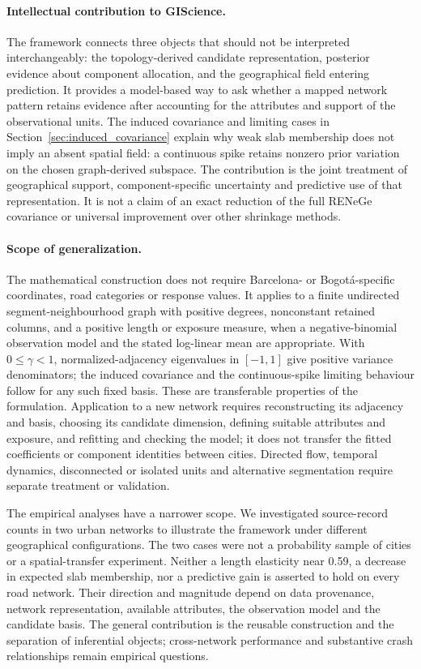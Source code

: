 \documentclass[11pt]{article}
\begin{document}
\paragraph{Intellectual contribution to GIScience.}
The framework connects three objects that should not be interpreted interchangeably: the topology-derived candidate representation, posterior evidence about component allocation, and the geographical field entering prediction. It provides a model-based way to ask whether a mapped network pattern retains evidence after accounting for the attributes and support of the observational units. The induced covariance and limiting cases in Section~\ref{sec:induced_covariance} explain why weak slab membership does not imply an absent spatial field: a continuous spike retains nonzero prior variation on the chosen graph-derived subspace. The contribution is the joint treatment of geographical support, component-specific uncertainty and predictive use of that representation. It is not a claim of an exact reduction of the full RENeGe covariance or universal improvement over other shrinkage methods.

\paragraph{Scope of generalization.}
The mathematical construction does not require Barcelona- or Bogot\'a-specific coordinates, road categories or response values. It applies to a finite undirected segment-neighbourhood graph with positive degrees, nonconstant retained columns, and a positive length or exposure measure, when a negative-binomial observation model and the stated log-linear mean are appropriate. With $0\leq\gamma<1$, normalized-adjacency eigenvalues in $[-1,1]$ give positive variance denominators; the induced covariance and the continuous-spike limiting behaviour follow for any such fixed basis. These are transferable properties of the formulation. Application to a new network requires reconstructing its adjacency and basis, choosing its candidate dimension, defining suitable attributes and exposure, and refitting and checking the model; it does not transfer the fitted coefficients or component identities between cities. Directed flow, temporal dynamics, disconnected or isolated units and alternative segmentation require separate treatment or validation.

The empirical analyses have a narrower scope. We investigated source-record counts in two urban networks to illustrate the framework under different geographical configurations. The two cases were not a probability sample of cities or a spatial-transfer experiment. Neither a length elasticity near 0.59, a decrease in expected slab membership, nor a predictive gain is asserted to hold on every road network. Their direction and magnitude depend on data provenance, network representation, available attributes, the observation model and the candidate basis. The general contribution is the reusable construction and the separation of inferential objects; cross-network performance and substantive crash relationships remain empirical questions.
\end{document}
